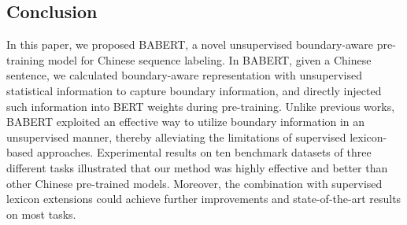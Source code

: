 \documentclass[11pt]{article}
\begin{document}
\begin{CJK}{UTF8}{gbsn}
\begin{table}[]
\centering
\small
{}
\caption{Example from the game domain. Red (Blue) represents correct (incorrect) entities.}
\label{tab:case-study}
\end{table}



\section{Conclusion}
\label{sec:conclusion}
In this paper, we proposed BABERT, a novel unsupervised boundary-aware pre-training model for Chinese sequence labeling.
In BABERT, given a Chinese sentence, we calculated boundary-aware representation with unsupervised statistical information to capture boundary information,
and directly injected such information into BERT weights during pre-training.
Unlike previous works, BABERT exploited an effective way to utilize boundary information in an unsupervised manner,
thereby alleviating the limitations of supervised lexicon-based approaches.
Experimental results on ten benchmark datasets of three different tasks illustrated that our method was highly effective and better than other Chinese pre-trained models. Moreover, the combination with supervised lexicon extensions could achieve further improvements and state-of-the-art results on most tasks.



\end{CJK}
\end{document}
